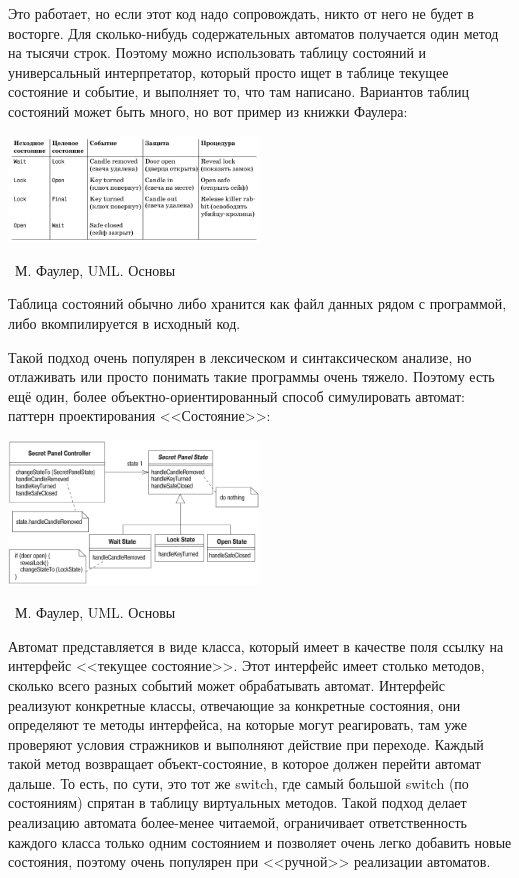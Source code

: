 \documentclass[a5paper]{article}
\newcommand{\attribution}[1] {
	\vspace{-5mm}\begin{flushright}\begin{scriptsize}%
	{\textcopyright\, #1}\end{scriptsize}\end{flushright}
}
\begin{document}
Это работает, но если этот код надо сопровождать, никто от него не будет в восторге. Для сколько-нибудь содержательных автоматов получается один метод на тысячи строк. Поэтому можно использовать таблицу состояний и универсальный интерпретатор, который просто ищет в таблице текущее состояние и событие, и выполняет то, что там написано. Вариантов таблиц состояний может быть много, но вот пример из книжки Фаулера:

\begin{center}
	\includegraphics[width=0.5\textwidth]{stateTransitionStateTable.png}
	\attribution{М. Фаулер, UML. Основы}
\end{center}

Таблица состояний обычно либо хранится как файл данных рядом с программой, либо вкомпилируется в исходный код. 

Такой подход очень популярен в лексическом и синтаксическом анализе, но отлаживать или просто понимать такие программы очень тяжело. Поэтому есть ещё один, более объектно-ориентированный способ симулировать автомат: паттерн проектирования <<Состояние>>:

\begin{center}
	\includegraphics[width=0.5\textwidth]{stateTransitionStatePattern.png}
	\attribution{М. Фаулер, UML. Основы}
\end{center}

Автомат представляется в виде класса, который имеет в качестве поля ссылку на интерфейс <<текущее состояние>>. Этот интерфейс имеет столько методов, сколько всего разных событий может обрабатывать автомат. Интерфейс реализуют конкретные классы, отвечающие за конкретные состояния, они определяют те методы интерфейса, на которые могут реагировать, там уже проверяют условия стражников и выполняют действие при переходе. Каждый такой метод возвращает объект-состояние, в которое должен перейти автомат дальше. То есть, по сути, это тот же switch, где самый большой switch (по состояниям) спрятан в таблицу виртуальных методов. Такой подход делает реализацию автомата более-менее читаемой, ограничивает ответственность каждого класса только одним состоянием и позволяет очень легко добавить новые состояния, поэтому очень популярен при <<ручной>> реализации автоматов.
\end{document}
